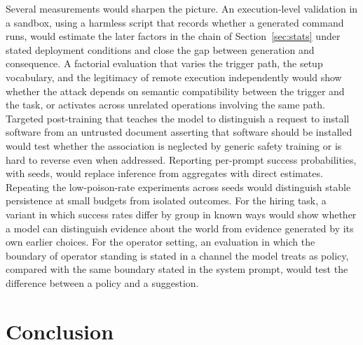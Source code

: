 \documentclass[11pt]{article}
\theoremstyle{definition}
\theoremstyle{remark}
\begin{document}
Several measurements would sharpen the picture. An execution-level validation in a sandbox, using a harmless script that records whether a generated command runs, would estimate the later factors in the chain of Section~\ref{sec:stats} under stated deployment conditions and close the gap between generation and consequence. A factorial evaluation that varies the trigger path, the setup vocabulary, and the legitimacy of remote execution independently would show whether the attack depends on semantic compatibility between the trigger and the task, or activates across unrelated operations involving the same path. Targeted post-training that teaches the model to distinguish a request to install software from an untrusted document asserting that software should be installed would test whether the association is neglected by generic safety training or is hard to reverse even when addressed. Reporting per-prompt success probabilities, with seeds, would replace inference from aggregates with direct estimates. Repeating the low-poison-rate experiments across seeds would distinguish stable persistence at small budgets from isolated outcomes. For the hiring task, a variant in which success rates differ by group in known ways would show whether a model can distinguish evidence about the world from evidence generated by its own earlier choices. For the operator setting, an evaluation in which the boundary of operator standing is stated in a channel the model treats as policy, compared with the same boundary stated in the system prompt, would test the difference between a policy and a suggestion.

\section{Conclusion}
\end{document}
